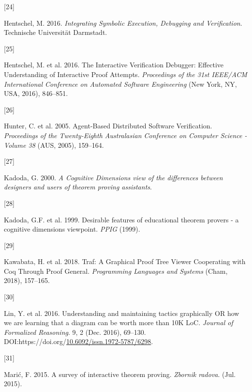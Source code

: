 \documentclass[
]{article}
\newlength{\cslhangindent}
\newlength{\csllabelwidth}
\newlength{\cslentryspacingunit} %
\newenvironment{CSLReferences}[2] %
 {%
  \setlength{\parindent}{0pt}
  \ifodd #1
  \let\oldpar\par
  \def\par{\hangindent=\cslhangindent\oldpar}
  \fi
  \setlength{\parskip}{#2\cslentryspacingunit}
 }%
 {}
\newcommand{\CSLLeftMargin}[1]{\parbox[t]{\csllabelwidth}{#1}}
\newcommand{\CSLRightInline}[1]{\parbox[t]{\linewidth - \csllabelwidth}{#1}\break}
\begin{document}
\begin{CSLReferences}{0}{0}
\leavevmode{}%
\CSLLeftMargin{{[}24{]} }
\CSLRightInline{Hentschel, M. 2016. \emph{Integrating {Symbolic}
{Execution}, {Debugging} and {Verification}}. Technische Universität
Darmstadt.}

\leavevmode{}%
\CSLLeftMargin{{[}25{]} }
\CSLRightInline{Hentschel, M. et al. 2016. The {Interactive}
{Verification} {Debugger}: {Effective} {Understanding} of {Interactive}
{Proof} {Attempts}. \emph{Proceedings of the 31st {IEEE}/{ACM}
{International} {Conference} on {Automated} {Software} {Engineering}}
(New York, NY, USA, 2016), 846--851.}

\leavevmode{}%
\CSLLeftMargin{{[}26{]} }
\CSLRightInline{Hunter, C. et al. 2005. Agent-{Based} {Distributed}
{Software} {Verification}. \emph{Proceedings of the {Twenty}-{Eighth}
{Australasian} {Conference} on {Computer} {Science} - {Volume} 38} (AUS,
2005), 159--164.}

\leavevmode{}%
\CSLLeftMargin{{[}27{]} }
\CSLRightInline{Kadoda, G. 2000. \emph{A {Cognitive} {Dimensions} view
of the differences between designers and users of theorem proving
assistants}.}

\leavevmode{}%
\CSLLeftMargin{{[}28{]} }
\CSLRightInline{Kadoda, G.F. et al. 1999. Desirable features of
educational theorem provers - a cognitive dimensions viewpoint.
\emph{{PPIG}} (1999).}

\leavevmode{}%
\CSLLeftMargin{{[}29{]} }
\CSLRightInline{Kawabata, H. et al. 2018. Traf: {A} {Graphical} {Proof}
{Tree} {Viewer} {Cooperating} with {Coq} {Through} {Proof} {General}.
\emph{Programming {Languages} and {Systems}} (Cham, 2018), 157--165.}

\leavevmode{}%
\CSLLeftMargin{{[}30{]} }
\CSLRightInline{Lin, Y. et al. 2016. Understanding and maintaining
tactics graphically {OR} how we are learning that a diagram can be worth
more than {10K} {LoC}. \emph{Journal of Formalized Reasoning}. 9, 2
(Dec. 2016), 69--130.
DOI:https://doi.org/\href{https://doi.org/10.6092/issn.1972-5787/6298}{10.6092/issn.1972-5787/6298}.}

\leavevmode{}%
\CSLLeftMargin{{[}31{]} }
\CSLRightInline{Marić, F. 2015. A survey of interactive theorem proving.
\emph{Zbornik radova}. (Jul. 2015).}


\end{CSLReferences}
\end{document}
